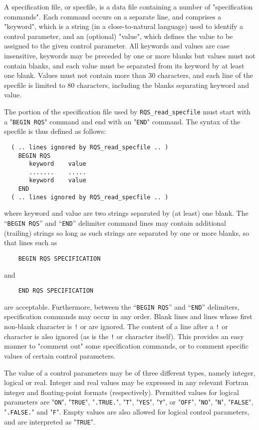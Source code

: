 \documentclass{galahad}
\newcommand{\packagename}{RQS}
\begin{document}
A specification file, or specfile, is a data file containing a number of
"specification commands". Each command occurs on a separate line,
and comprises a "keyword",
which is a string (in a close-to-natural language) used to identify a
control parameter, and
an (optional) "value", which defines the value to be assigned to the given
control parameter. All keywords and values are case insensitive,
keywords may be preceded by one or more blanks but
values must not contain blanks, and
each value must be separated from its keyword by at least one blank.
Values must not contain more than 30 characters, and
each line of the specfile is limited to 80 characters,
including the blanks separating keyword and value.

The portion of the specification file used by
{\tt \packagename\_read\_specfile}
must start
with a "{\tt BEGIN \packagename}" command and end with an
"{\tt END}" command.  The syntax of the specfile is thus defined as follows:
\begin{verbatim}
  ( .. lines ignored by RQS_read_specfile .. )
    BEGIN RQS
       keyword    value
       .......    .....
       keyword    value
    END
  ( .. lines ignored by RQS_read_specfile .. )
\end{verbatim}
where keyword and value are two strings separated by (at least) one blank.
The ``{\tt BEGIN \packagename}'' and ``{\tt END}'' delimiter command lines
may contain additional (trailing) strings so long as such strings are
separated by one or more blanks, so that lines such as
\begin{verbatim}
    BEGIN RQS SPECIFICATION
\end{verbatim}
and
\begin{verbatim}
    END RQS SPECIFICATION
\end{verbatim}
are acceptable. Furthermore,
between the
``{\tt BEGIN \packagename}'' and ``{\tt END}'' delimiters,
specification commands may occur in any order.  Blank lines and
lines whose first non-blank character is {\tt !} or {\tt *} are ignored.
The content
of a line after a {\tt !} or {\tt *} character is also
ignored (as is the {\tt !} or {\tt *}
character itself). This provides an easy manner to "comment out" some
specification commands, or to comment specific values
of certain control parameters.

The value of a control parameters may be of three different types, namely
integer, logical or real.
Integer and real values may be expressed in any relevant Fortran integer and
floating-point formats (respectively). Permitted values for logical
parameters are "{\tt ON}", "{\tt TRUE}", "{\tt .TRUE.}", "{\tt T}",
"{\tt YES}", "{\tt Y}", or "{\tt OFF}", "{\tt NO}",
"{\tt N}", "{\tt FALSE}", "{\tt .FALSE.}" and "{\tt F}".
Empty values are also allowed for
logical control parameters, and are interpreted as "{\tt TRUE}".
\end{document}
